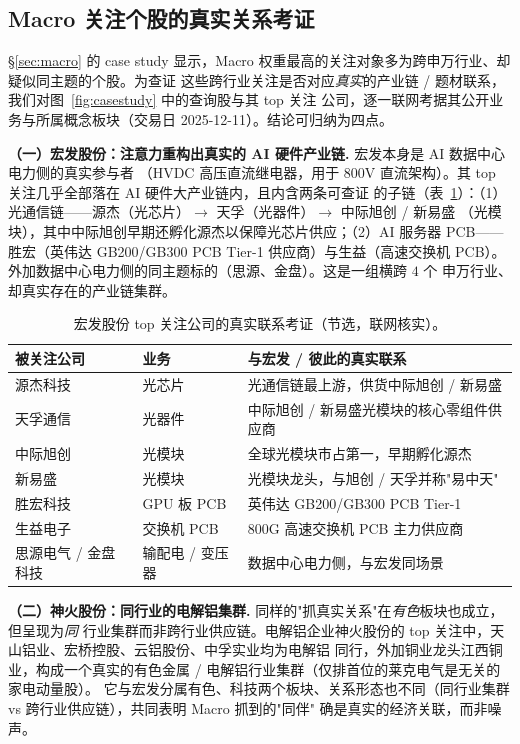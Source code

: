 \documentclass[a4paper,11pt,fontset=fandol]{ctexart}
\begin{document}
\subsection{Macro 关注个股的真实关系考证}\label{sec:casestudy-rel}
§\ref{sec:macro} 的 case study 显示，Macro 权重最高的关注对象多为跨申万行业、却疑似同主题的个股。为查证
这些跨行业关注是否对应\emph{真实}的产业链 / 题材联系，我们对图~\ref{fig:casestudy} 中的查询股与其 top 关注
公司，逐一联网考据其公开业务与所属概念板块（交易日 2025-12-11）。结论可归纳为四点。

\textbf{\heiti（一）宏发股份：注意力重构出真实的 AI 硬件产业链.} 宏发本身是 AI 数据中心电力侧的真实参与者
（HVDC 高压直流继电器，用于 800V 直流架构）。其 top 关注几乎全部落在 AI 硬件大产业链内，且内含两条可查证
的子链（表~\ref{tab:casestudy}）：（1）光通信链——源杰（光芯片）$\to$ 天孚（光器件）$\to$ 中际旭创 / 新易盛
（光模块），其中中际旭创早期还孵化源杰以保障光芯片供应；（2）AI 服务器 PCB——胜宏（英伟达 GB200/GB300 PCB
Tier-1 供应商）与生益（高速交换机 PCB）。外加数据中心电力侧的同主题标的（思源、金盘）。这是一组横跨 $4$ 个
申万行业、却真实存在的产业链集群。

\begin{table}[H]
\centering
\caption{宏发股份 top 关注公司的真实联系考证（节选，联网核实）。}
\label{tab:casestudy}
\begin{tabular}{lll}
\toprule
被关注公司 & 业务 & 与宏发 / 彼此的真实联系 \\
\midrule
源杰科技 & 光芯片 & 光通信链最上游，供货中际旭创 / 新易盛 \\
天孚通信 & 光器件 & 中际旭创 / 新易盛光模块的核心零组件供应商 \\
中际旭创 & 光模块 & 全球光模块市占第一，早期孵化源杰 \\
新易盛   & 光模块 & 光模块龙头，与旭创 / 天孚并称"易中天" \\
胜宏科技 & GPU 板 PCB & 英伟达 GB200/GB300 PCB Tier-1 \\
生益电子 & 交换机 PCB & 800G 高速交换机 PCB 主力供应商 \\
思源电气 / 金盘科技 & 输配电 / 变压器 & 数据中心电力侧，与宏发同场景 \\
\bottomrule
\end{tabular}
\end{table}

\textbf{\heiti（二）神火股份：同行业的电解铝集群.} 同样的"抓真实关系"在\emph{有色}板块也成立，但呈现为\emph{同}
行业集群而非跨行业供应链。电解铝企业神火股份的 top 关注中，天山铝业、宏桥控股、云铝股份、中孚实业均为电解铝
同行，外加铜业龙头江西铜业，构成一个真实的有色金属 / 电解铝行业集群（仅排首位的莱克电气是无关的家电动量股）。
它与宏发分属有色、科技两个板块、关系形态也不同（同行业集群 vs 跨行业供应链），共同表明 Macro 抓到的"同伴"
确是真实的经济关联，而非噪声。
\end{document}

